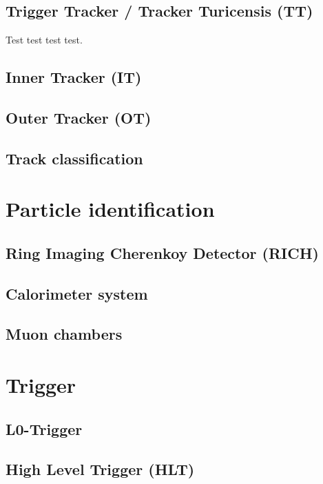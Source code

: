 \subsection{Trigger Tracker / Tracker Turicensis (TT)}
Test test test test.

\subsection{Inner Tracker (IT)}

\subsection{Outer Tracker (OT)}

\subsection{Track classification}


\section{Particle identification}

\subsection{Ring Imaging Cherenkoy Detector (RICH)}

\subsection{Calorimeter system}

\subsection{Muon chambers}

\section{Trigger}

\subsection{L0-Trigger}

\subsection{High Level Trigger (HLT)}
